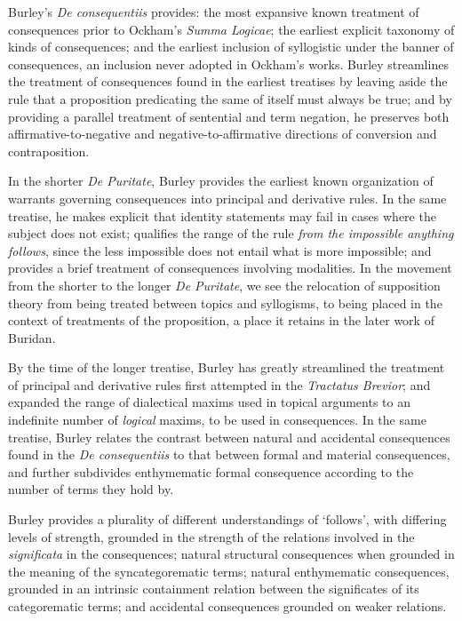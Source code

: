 \documentclass[]{birkjour}
\begin{document}
Burley's \textit{De consequentiis} provides: the most expansive known treatment of consequences prior to Ockham's \textit{Summa Logicae}; the earliest explicit taxonomy of kinds of consequences; and the earliest inclusion of syllogistic under the banner of consequences, an inclusion never adopted in Ockham's works. Burley streamlines the treatment of consequences found in the earliest treatises by leaving aside the rule that a proposition predicating the same of itself must always be true; and by providing a parallel treatment of sentential and term negation, he preserves both affirmative-to-negative and negative-to-affirmative directions of conversion and contraposition.

In the shorter \textit{De Puritate}, Burley provides the earliest known organization of warrants governing consequences into principal and derivative rules. In the same treatise, he makes explicit that identity statements may fail in cases where the subject does not exist; qualifies the range of the rule \textit{from the impossible anything follows}, since the less impossible does not entail what is more impossible; and provides a brief treatment of consequences involving modalities. In the movement from the shorter to the longer \textit{De Puritate}, we see the relocation of supposition theory from being treated between topics and syllogisms, to being placed in the context of treatments of the proposition, a place it retains in the later work of Buridan.

By the time of the longer treatise, Burley has greatly streamlined the treatment of principal and derivative rules first attempted in the \textit{Tractatus Brevior}; and expanded the range of dialectical maxims used in topical arguments to an indefinite number of \textit{logical} maxims, to be used in consequences. In the same treatise, Burley relates the contrast between natural and accidental consequences found in the \textit{De consequentiis} to that between formal and material consequences, and further subdivides enthymematic formal consequence according to the number of terms they hold by.

Burley provides a plurality of different understandings of `follows', with differing levels of strength, grounded in the strength of the relations involved in the \textit{significata} in the consequences; natural structural consequences when grounded in the meaning of the syncategorematic terms; natural enthymematic consequences, grounded in an intrinsic containment relation between the significates of its categorematic terms; and accidental consequences grounded on weaker relations. 
\end{document}
